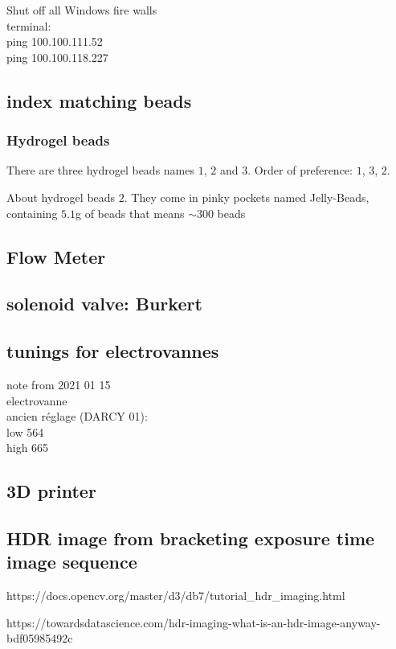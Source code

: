 \documentclass[twocolumn,amsmath,amssymb,floatfix]{article}
\begin{document}
Shut off all Windows fire walls\\
terminal:\\
ping 100.100.111.52\\
ping 100.100.118.227\\

\subsection{index matching beads}
\subsubsection{Hydrogel beads}
There are three hydrogel beads names $1$, $2$ and $3$.
Order of preference: $1$, $3$, $2$.

About hydrogel beads $2$. They come in pinky pockets named Jelly-Beads, containing $5.1$g of beads that means $\sim300$ beads
\subsection{Flow Meter}

\subsection{solenoid valve: Burkert}

\subsection{tunings for electrovannes}

note from 2021 01 15\\
electrovanne\\
ancien réglage (DARCY 01):\\
low  564 \\
high 665\\


\subsection{3D printer}

\subsection{HDR image from bracketing exposure time image sequence}

https://docs.opencv.org/master/d3/db7/tutorial_hdr_imaging.html

https://towardsdatascience.com/hdr-imaging-what-is-an-hdr-image-anyway-bdf05985492c
\end{document}
